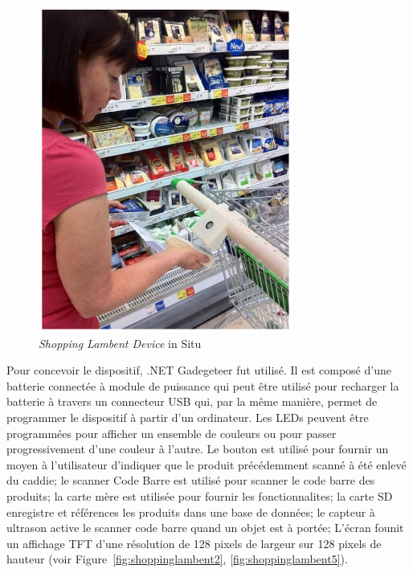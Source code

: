 \documentclass[10pt,a5paper,twoside]{article}
\begin{document}
\begin{figure}
\centering
\includegraphics[]{images/shoppinglambent-screenshot1.png}
\caption{\emph{Shopping Lambent Device} in
Situ}\label{fig:shoppinglambent1}
\end{figure}

Pour concevoir le dispositif, .NET Gadegeteer fut utilisé. Il est
composé d'une batterie connectée à module de puissance qui peut être
utilisé pour recharger la batterie à travers un connecteur USB qui, par
la même manière, permet de programmer le dispositif à partir d'un
ordinateur. Les LEDs peuvent être programmées pour afficher un ensemble
de couleurs ou pour passer progressivement d'une couleur à l'autre. Le
bouton est utilisé pour fournir un moyen à l'utilisateur d'indiquer que
le produit précédemment scanné à été enlevé du caddie; le scanner Code
Barre est utilisé pour scanner le code barre des produits; la carte mère
est utilisée pour fournir les fonctionnalites; la carte SD enregistre et
références les produits dans une base de données; le capteur à ultrason
active le scanner code barre quand un objet est à portée; L'écran founit
un affichage TFT d'une résolution de 128 pixels de largeur sur 128
pixels de hauteur (voir Figure~\ref{fig:shoppinglambent2},
\ref{fig:shoppinglambent5}).
\end{document}
